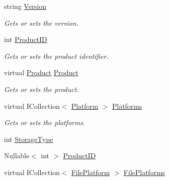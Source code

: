 \begin{DoxyCompactItemize}
string \hyperlink{class_open_1_1_g_i_1_1hypermart_1_1_models_1_1_file_a59b1cbe55394fce55d55200ea7e55cae}{Version}
\begin{DoxyCompactList}\small\item\em Gets or sets the version. \end{DoxyCompactList}\item 
int \hyperlink{class_open_1_1_g_i_1_1hypermart_1_1_models_1_1_file_a7f0a3da01808662b23635d9b9b6f6848}{Product\+I\+D}
\begin{DoxyCompactList}\small\item\em Gets or sets the product identifier. \end{DoxyCompactList}\item 
virtual \hyperlink{class_open_1_1_g_i_1_1hypermart_1_1_models_1_1_product}{Product} \hyperlink{class_open_1_1_g_i_1_1hypermart_1_1_models_1_1_file_ad2c5d00ebf4d4414a96911606fecc6cb}{Product}
\begin{DoxyCompactList}\small\item\em Gets or sets the product. \end{DoxyCompactList}\item 
virtual I\+Collection$<$ \hyperlink{class_open_1_1_g_i_1_1hypermart_1_1_models_1_1_platform}{Platform} $>$ \hyperlink{class_open_1_1_g_i_1_1hypermart_1_1_models_1_1_file_a7cf38ed851b70df6af9b0606c4d744ed}{Platforms}
\begin{DoxyCompactList}\small\item\em Gets or sets the platforms. \end{DoxyCompactList}\item 
int \hyperlink{class_open_1_1_g_i_1_1hypermart_1_1_models_1_1_file_ab4ac8af085696918a7a4e1765639066d}{Storage\+Type}
\item 
Nullable$<$ int $>$ \hyperlink{class_open_1_1_g_i_1_1hypermart_1_1_models_1_1_file_ad0b974d38df4491ce90d1d5e884a56a8}{Product\+I\+D}
\item 
virtual I\+Collection$<$ \hyperlink{class_open_1_1_g_i_1_1hypermart_1_1_models_1_1_file_platform}{File\+Platform} $>$ \hyperlink{class_open_1_1_g_i_1_1hypermart_1_1_models_1_1_file_ac075b378d09c288deda822c0ea6b854c}{File\+Platforms}
\end{DoxyCompactItemize}


